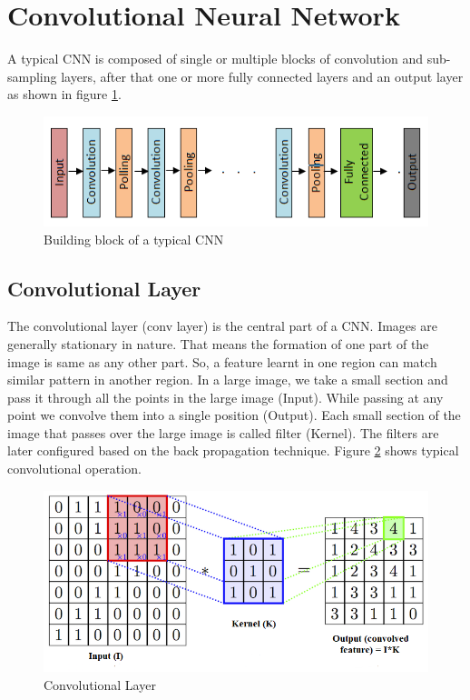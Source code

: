 \documentclass[conference]{IEEEtran}
\begin{document}
\section{Convolutional Neural Network}
A typical CNN is composed of single or multiple blocks of convolution and sub-sampling layers, after that one or more fully connected layers and an output layer as shown in figure \ref{fcnn}.

\begin{figure}[htb]
	\centering
	\includegraphics[scale=0.4 ]{image/CNN}
	\caption{Building block of a typical CNN}
	\label{fcnn}
\end{figure}

 \subsection{Convolutional Layer}
The convolutional layer (conv layer) is the central part of a CNN. Images are generally stationary in nature. That means the formation of one part of the image is same as any other part. So, a feature learnt in one region can match similar pattern in another region. In a large image, we take a small section and pass it through all the points in the large image (Input). While passing at any point we convolve them into a single position (Output). Each small section of the image that passes over the large image is called filter (Kernel). The filters are later configured based on the back propagation technique. Figure \ref{fconv_layer} shows typical convolutional operation.

\begin{figure}[htb]
	\centering
	\includegraphics[scale=0.3]{image/Conv_layer}
	\caption{Convolutional Layer}
	\label{fconv_layer}
\end{figure}
\end{document}
